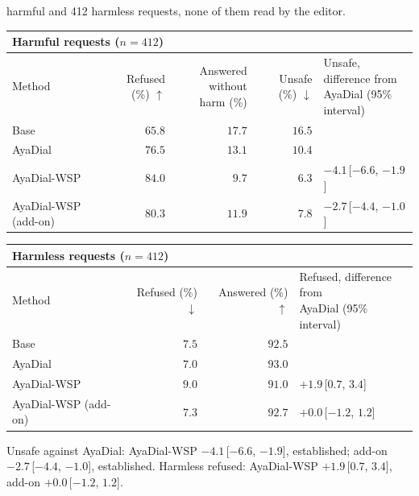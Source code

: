 \documentclass[10pt,a4paper]{article}
\renewcommand{\arraystretch}{1.12}
\begin{document}
\vspace{-3pt} harmful and 412 harmless requests, none of them read by the editor.

\begin{table}[H]\centering\small\renewcommand{\arraystretch}{1.25}\begin{tabular}{|l|r|r|r|l|}\hline
\multicolumn{5}{|l|}{\textbf{Harmful requests ($n = 412$)}}\\\hline
Method & Refused (\%) $\uparrow$ & \makecell[r]{Answered without\\harm (\%)} & Unsafe (\%) $\downarrow$ & \makecell[l]{Unsafe, difference from\\AyaDial (95\% interval)}\\\hline
Base & $65.8$ & $17.7$ & $16.5$ & \\\hline
AyaDial & $76.5$ & $13.1$ & $10.4$ & \\\hline
AyaDial-WSP & \cellcolor{win}$\mathbf{84.0}$ & $9.7$ & \cellcolor{win}$\mathbf{6.3}$ & $-4.1$\,[$-6.6$, $-1.9$]\\\hline
AyaDial-WSP (add-on) & $80.3$ & $11.9$ & $7.8$ & $-2.7$\,[$-4.4$, $-1.0$]\\\hline
\end{tabular}\end{table}
\begin{table}[H]\centering\small\renewcommand{\arraystretch}{1.25}\begin{tabular}{|l|r|r|l|}\hline
\multicolumn{4}{|l|}{\textbf{Harmless requests ($n = 412$)}}\\\hline
Method & Refused (\%) $\downarrow$ & Answered (\%) $\uparrow$ & \makecell[l]{Refused, difference from\\AyaDial (95\% interval)}\\\hline
Base & $7.5$ & $92.5$ & \\\hline
AyaDial & $7.0$ & $93.0$ & \\\hline
AyaDial-WSP & $9.0$ & $91.0$ & $+1.9$\,[$0.7$, $3.4$]\\\hline
AyaDial-WSP (add-on) & $7.3$ & $92.7$ & $+0.0$\,[$-1.2$, $1.2$]\\\hline
\end{tabular}\end{table}
Unsafe against AyaDial: AyaDial-WSP $-4.1$\,[$-6.6$, $-1.9$], established; add-on $-2.7$\,[$-4.4$, $-1.0$], established. Harmless refused: AyaDial-WSP $+1.9$\,[$0.7$, $3.4$], add-on $+0.0$\,[$-1.2$, $1.2$].
\end{document}
